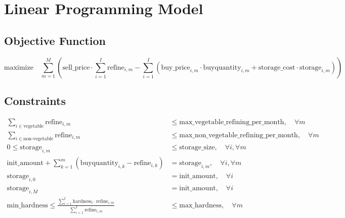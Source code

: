 \documentclass{article}
\begin{document}
\section*{Linear Programming Model}

\subsection*{Objective Function}
\[
\text{maximize} \quad \sum_{m=1}^{M} \left( \text{sell\_price} \cdot \sum_{i=1}^{I} \text{refine}_{i, m} - \sum_{i=1}^{I} (\text{buy\_price}_{i, m} \cdot \text{buyquantity}_{i, m} + \text{storage\_cost} \cdot \text{storage}_{i, m}) \right)
\]

\subsection*{Constraints}
\begin{align*}
\sum_{i \in \text{vegetable}} \text{refine}_{i, m} &\leq \text{max\_vegetable\_refining\_per\_month}, \quad \forall m \\
\sum_{i \in \text{non-vegetable}} \text{refine}_{i, m} &\leq \text{max\_non\_vegetable\_refining\_per\_month}, \quad \forall m \\
0 \leq \text{storage}_{i, m} &\leq \text{storage\_size}, \quad \forall i, \forall m \\
\text{init\_amount} + \sum_{k=1}^{m} (\text{buyquantity}_{i, k} - \text{refine}_{i, k}) &= \text{storage}_{i, m}, \quad \forall i, \forall m \\
\text{storage}_{i, 0} &= \text{init\_amount}, \quad \forall i \\
\text{storage}_{i, M} &= \text{init\_amount}, \quad \forall i \\
\text{min\_hardness} \leq \frac{\sum_{i=1}^{I} \text{hardness}_{i} \cdot \text{refine}_{i, m}}{\sum_{i=1}^{I} \text{refine}_{i, m}} &\leq \text{max\_hardness}, \quad \forall m
\end{align*}
\end{document}

